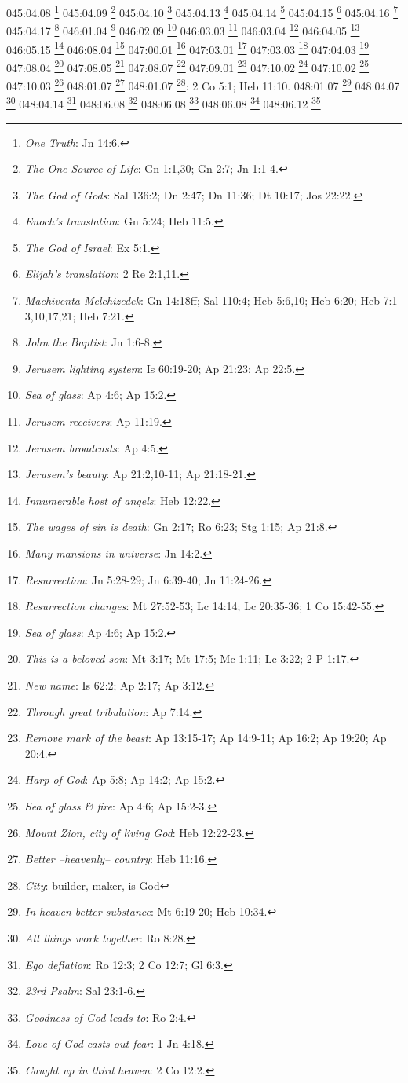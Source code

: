 {{{{{{{{{{{{{{{{{{{{{{{045:04.08 \footnote{\textit{One Truth}: Jn 14:6.}
045:04.09 \footnote{\textit{The One Source of Life}: Gn 1:1,30; Gn 2:7; Jn 1:1-4.}
045:04.10 \footnote{\textit{The God of Gods}: Sal 136:2; Dn 2:47; Dn 11:36; Dt 10:17; Jos 22:22.}
045:04.13 \footnote{\textit{Enoch's translation}: Gn 5:24; Heb 11:5.}
045:04.14 \footnote{\textit{The God of Israel}: Ex 5:1.}
045:04.15 \footnote{\textit{Elijah's translation}: 2 Re 2:1,11.}
045:04.16 \footnote{\textit{Machiventa Melchizedek}: Gn 14:18ff; Sal 110:4; Heb 5:6,10; Heb 6:20; Heb 7:1-3,10,17,21; Heb 7:21.}
045:04.17 \footnote{\textit{John the Baptist}: Jn 1:6-8.}
046:01.04 \footnote{\textit{Jerusem lighting system}: Is 60:19-20; Ap 21:23; Ap 22:5.}
046:02.09 \footnote{\textit{Sea of glass}: Ap 4:6; Ap 15:2.}
046:03.03 \footnote{\textit{Jerusem receivers}: Ap 11:19.}
046:03.04 \footnote{\textit{Jerusem broadcasts}: Ap 4:5.}
046:04.05 \footnote{\textit{Jerusem's beauty}: Ap 21:2,10-11; Ap 21:18-21.}
046:05.15 \footnote{\textit{Innumerable host of angels}: Heb 12:22.}
046:08.04 \footnote{\textit{The wages of sin is death}: Gn 2:17; Ro 6:23; Stg 1:15; Ap 21:8.}
047:00.01 \footnote{\textit{Many mansions in universe}: Jn 14:2.}
047:03.01 \footnote{\textit{Resurrection}: Jn 5:28-29; Jn 6:39-40; Jn 11:24-26.}
047:03.03 \footnote{\textit{Resurrection changes}: Mt 27:52-53; Lc 14:14; Lc 20:35-36; 1 Co 15:42-55.}
047:04.03 \footnote{\textit{Sea of glass}: Ap 4:6; Ap 15:2.}
047:08.04 \footnote{\textit{This is a beloved son}: Mt 3:17; Mt 17:5; Mc 1:11; Lc 3:22; 2 P 1:17.}
047:08.05 \footnote{\textit{New name}: Is 62:2; Ap 2:17; Ap 3:12.}
047:08.07 \footnote{\textit{Through great tribulation}: Ap 7:14.}
047:09.01 \footnote{\textit{Remove mark of the beast}: Ap 13:15-17; Ap 14:9-11; Ap 16:2; Ap 19:20; Ap 20:4.}
047:10.02 \footnote{\textit{Harp of God}: Ap 5:8; Ap 14:2; Ap 15:2.}
047:10.02 \footnote{\textit{Sea of glass & fire}: Ap 4:6; Ap 15:2-3.}
047:10.03 \footnote{\textit{Mount Zion, city of living God}: Heb 12:22-23.}
048:01.07 \footnote{\textit{Better --heavenly-- country}: Heb 11:16.}
048:01.07 \footnote{\textit{City}: builder, maker, is God}: 2 Co 5:1; Heb 11:10.}
048:01.07 \footnote{\textit{In heaven better substance}: Mt 6:19-20; Heb 10:34.}
048:04.07 \footnote{\textit{All things work together}: Ro 8:28.}
048:04.14 \footnote{\textit{Ego deflation}: Ro 12:3; 2 Co 12:7; Gl 6:3.}
048:06.08 \footnote{\textit{23rd Psalm}: Sal 23:1-6.}
048:06.08 \footnote{\textit{Goodness of God leads to}: Ro 2:4.}
048:06.08 \footnote{\textit{Love of God casts out fear}: 1 Jn 4:18.}
048:06.12 \footnote{\textit{Caught up in third heaven}: 2 Co 12:2.}
}}}}}}}}}}}}}}}}}}}}}}
